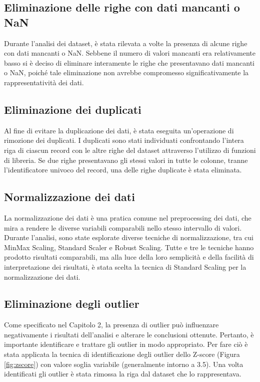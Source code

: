 \begin{flushleft}
\subsection{Eliminazione delle righe con dati mancanti o NaN}
Durante l'analisi dei dataset, è stata rilevata a volte la presenza di alcune righe con dati mancanti o NaN. Sebbene il numero di valori mancanti era relativamente basso si è deciso di eliminare interamente le righe che presentavano dati mancanti o NaN, poiché tale eliminazione non avrebbe compromesso significativamente la rappresentatività dei dati.

\subsection{Eliminazione dei duplicati}
Al fine di evitare la duplicazione dei dati, è stata eseguita un'operazione di rimozione dei duplicati. I duplicati sono stati individuati confrontando l'intera riga di ciascun record con le altre righe del dataset attraverso l'utilizzo di funzioni di libreria.
Se due righe presentavano gli stessi valori in tutte le colonne, tranne l'identificatore univoco del record, una delle righe duplicate è stata eliminata.

\subsection{Normalizzazione dei dati}
La normalizzazione dei dati è una pratica comune nel preprocessing dei dati, che mira a rendere le diverse variabili comparabili nello stesso intervallo di valori. Durante l'analisi, sono state esplorate diverse tecniche di normalizzazione, tra cui MinMax Scaling, Standard Scaler e Robust Scaling. Tutte e tre le tecniche hanno prodotto risultati comparabili, ma alla luce della loro semplicità e della facilità di interpretazione dei risultati, è stata scelta la tecnica di Standard Scaling per la normalizzazione dei dati.

\subsection{Eliminazione degli outlier}
Come specificato nel Capitolo 2, la presenza di outlier può influenzare negativamente i risultati dell'analisi e alterare le conclusioni ottenute. 
Pertanto, è importante identificare e trattare gli outlier in modo appropriato.
Per fare ciò è stata applicata la tecnica di identificazione degli outlier dello Z-score (Figura \ref{fig:zscore}) con valore soglia variabile (generalmente  intorno a 3.5).
Una volta identificati gli outlier è stata rimossa la riga dal dataset che lo rappresentava.


\end{flushleft}
